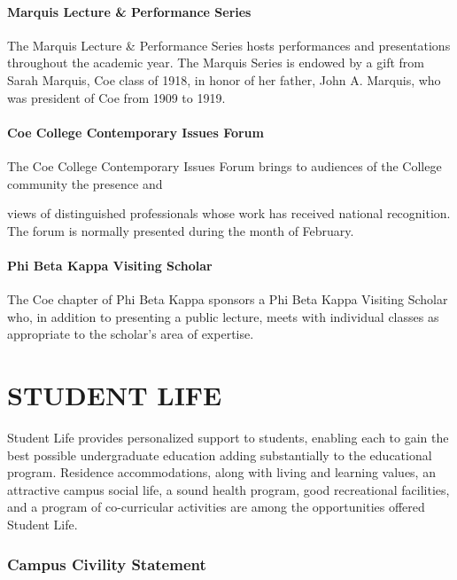 \documentclass[
  letterpaper,
]{scrbook}
\begin{document}
\subsubsection{Marquis Lecture \& Performance
Series}\label{marquis-lecture-performance-series}

The Marquis Lecture \& Performance Series hosts performances and
presentations throughout the academic year. The Marquis Series is
endowed by a gift from Sarah Marquis, Coe class of 1918, in honor of her
father, John A. Marquis, who was president of Coe from 1909 to 1919.

\subsubsection{Coe College Contemporary Issues
Forum}\label{coe-college-contemporary-issues-forum}

The Coe College Contemporary Issues Forum brings to audiences of the
College community the presence and

views of distinguished professionals whose work has received national
recognition. The forum is normally presented during the month of
February.

\subsubsection{Phi Beta Kappa Visiting
Scholar}\label{phi-beta-kappa-visiting-scholar}

The Coe chapter of Phi Beta Kappa sponsors a Phi Beta Kappa Visiting
Scholar who, in addition to presenting a public lecture, meets with
individual classes as appropriate to the scholar's area of expertise.

\chapter{STUDENT LIFE}\label{student-life}

Student Life provides personalized support to students, enabling each to
gain the best possible undergraduate education adding substantially to
the educational program. Residence accommodations, along with living and
learning values, an attractive campus social life, a sound health
program, good recreational facilities, and a program of co-curricular
activities are among the opportunities offered Student Life.

\subsection{Campus Civility Statement}\label{campus-civility-statement}
\end{document}
